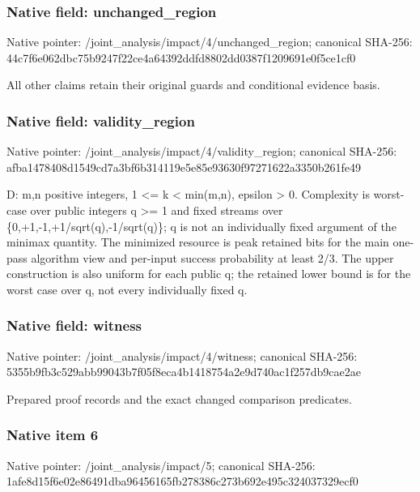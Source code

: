 \documentclass[10pt,a4paper]{article}
\begin{document}
\subsubsection{Native field: unchanged\_\allowbreak{}region}
Native pointer: /joint\_\allowbreak{}analysis/impact/4/unchanged\_\allowbreak{}region; canonical SHA-256: 44c7f6e062dbc75b9247f22ce4a64392ddfd8802dd0387f1209691e0f5ce1cf0

\begingroup\raggedright\sloppy All other claims retain their original guards and conditional evidence basis.\par\endgroup

\subsubsection{Native field: validity\_\allowbreak{}region}
Native pointer: /joint\_\allowbreak{}analysis/impact/4/validity\_\allowbreak{}region; canonical SHA-256: afba1478408d1549cd7a3bf6b314119e5e85e93630f97271622a3350b261fe49

\begingroup\raggedright\sloppy D:\allowbreak{} m,\allowbreak{}n positive integers,\allowbreak{} 1 <=\allowbreak{} k < min(m,\allowbreak{}n),\allowbreak{} epsilon > 0. Complexity is worst-case over public integers q >=\allowbreak{} 1 and fixed streams over \{0,\allowbreak{}+1,\allowbreak{}-1,\allowbreak{}+1/\allowbreak{}sqrt(q),\allowbreak{}-1/\allowbreak{}sqrt(q)\};\allowbreak{} q is not an individually fixed argument of the minimax quantity. The minimized resource is peak retained bits for the main one-pass algorithm view and per-input success probability at least 2/\allowbreak{}3. The upper construction is also uniform for each public q;\allowbreak{} the retained lower bound is for the worst case over q,\allowbreak{} not every individually fixed q.\par\endgroup

\subsubsection{Native field: witness}
Native pointer: /joint\_\allowbreak{}analysis/impact/4/witness; canonical SHA-256: 5355b9fb3c529abb99043b7f05f8eca4b1418754a2e9d740ac1f257db9cae2ae

\begingroup\raggedright\sloppy Prepared proof records and the exact changed comparison predicates.\par\endgroup

\subsubsection{Native item 6}
Native pointer: /joint\_\allowbreak{}analysis/impact/5; canonical SHA-256: 1afe8d15f6e02e86491dba96456165fb278386c273b692e495c324037329ecf0
\end{document}
